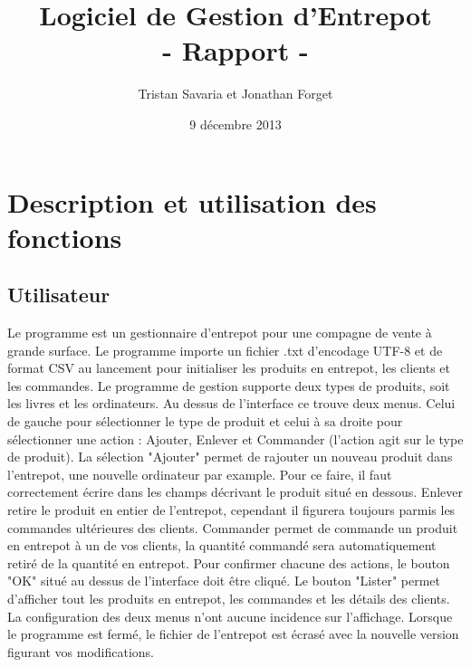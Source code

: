 \documentclass[11pt, french]{article} %
\title{Logiciel de Gestion d'Entrepot\\- Rapport -}
\author{Tristan Savaria et Jonathan Forget}
\date{9 décembre 2013}
\begin{document}
\maketitle
\newpage
\tableofcontents
\newpage
\section{Description et utilisation des fonctions}
\paragraph{}

\subsection{Utilisateur}

Le programme est un gestionnaire d'entrepot pour une compagne de vente à grande surface. Le programme importe un fichier .txt d'encodage UTF-8 et de format CSV au lancement pour initialiser les produits en entrepot, les clients et les commandes. Le programme de gestion supporte deux types de produits, soit les livres et les ordinateurs. Au dessus de l'interface ce trouve deux menus. Celui de gauche pour sélectionner le type de produit et celui à sa droite pour sélectionner une action : Ajouter, Enlever et Commander (l'action agit sur le type de produit). La sélection "Ajouter" permet de rajouter un nouveau produit dans l'entrepot, une nouvelle ordinateur par example. Pour ce faire, il faut correctement écrire dans les champs décrivant le produit situé en dessous. Enlever retire le produit en entier de l'entrepot, cependant il figurera toujours parmis les commandes ultérieures des clients. Commander permet de commande un produit en entrepot à un de vos clients, la quantité commandé sera automatiquement retiré de la quantité en entrepot. Pour confirmer chacune des actions, le bouton "OK" situé au dessus de l'interface doit être cliqué. Le bouton "Lister" permet d'afficher tout les produits en entrepot, les commandes et les détails des clients. La configuration des deux menus n'ont aucune incidence sur l'affichage. Lorsque le programme est fermé, le fichier de l'entrepot est écrasé avec la nouvelle version figurant vos modifications.
\end{document}
